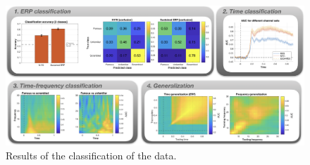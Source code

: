 \documentclass[utf8]{frontiersSCNS} %
\begin{document}
\begin{figure}[ht!]
\centering\includegraphics[width=\linewidth]{MVPA_results}
\caption{Results of the classification of the \cite{Wakeman2015ADataset} data.}\label{fig:results}
\end{figure}

\end{document}
